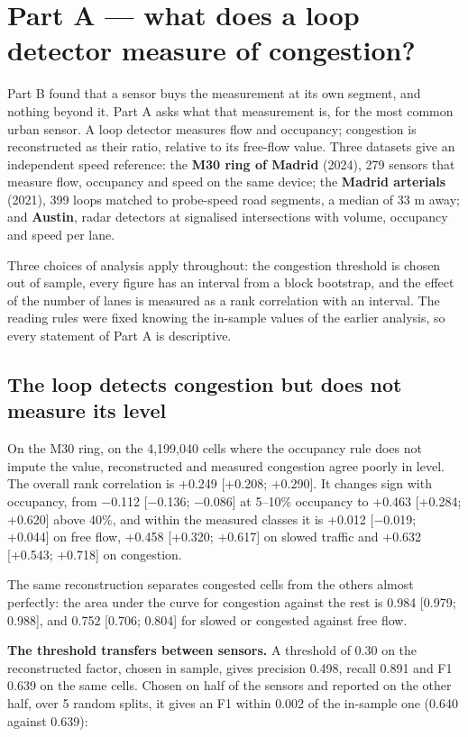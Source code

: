 \section{Part A — what does a loop detector measure of congestion?}
Part B found that a sensor buys the measurement at its own segment, and nothing beyond it. Part A asks what that measurement is, for the most common urban sensor. A loop detector measures flow and occupancy; congestion is reconstructed as their ratio, relative to its free-flow value. Three datasets give an independent speed reference: the \textbf{M30 ring of Madrid} (2024), 279 sensors that measure flow, occupancy and speed on the same device; the \textbf{Madrid arterials} (2021), 399 loops matched to probe-speed road segments, a median of 33 m away; and \textbf{Austin}, radar detectors at signalised intersections with volume, occupancy and speed per lane.

Three choices of analysis apply throughout: the congestion threshold is chosen out of sample, every figure has an interval from a block bootstrap, and the effect of the number of lanes is measured as a rank correlation with an interval. The reading rules were fixed knowing the in-sample values of the earlier analysis, so every statement of Part A is descriptive.

\subsection{The loop detects congestion but does not measure its level}
On the M30 ring, on the 4,199,040 cells where the occupancy rule does not impute the value, reconstructed and measured congestion agree poorly in level. The overall rank correlation is +0.249 [+0.208; +0.290]. It changes sign with occupancy, from −0.112 [−0.136; −0.086] at 5–10\% occupancy to +0.463 [+0.284; +0.620] above 40\%, and within the measured classes it is +0.012 [−0.019; +0.044] on free flow, +0.458 [+0.320; +0.617] on slowed traffic and +0.632 [+0.543; +0.718] on congestion.

The same reconstruction separates congested cells from the others almost perfectly: the area under the curve for congestion against the rest is 0.984 [0.979; 0.988], and 0.752 [0.706; 0.804] for slowed or congested against free flow.

\textbf{The threshold transfers between sensors.} A threshold of 0.30 on the reconstructed factor, chosen in sample, gives precision 0.498, recall 0.891 and F1 0.639 on the same cells. Chosen on half of the sensors and reported on the other half, over 5 random splits, it gives an F1 within 0.002 of the in-sample one (0.640 against 0.639):

